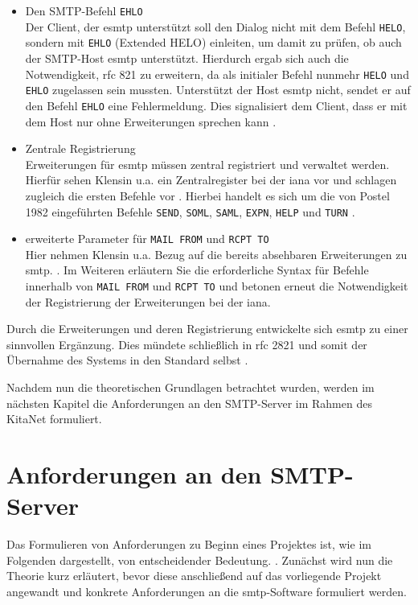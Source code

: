 \begin{itemize}
	\item{Den SMTP-Befehl \verb+EHLO+}\\
	Der Client, der \ac{esmtp} unterstützt soll den Dialog nicht mit dem Befehl \verb+HELO+, sondern mit \verb+EHLO+ (Extended HELO) einleiten, um damit zu prüfen, ob auch der SMTP-Host \ac{esmtp} unterstützt. Hierdurch ergab sich auch die Notwendigkeit, \ac{rfc} 821 zu erweitern, da als initialer Befehl nunmehr \verb+HELO+ und \verb+EHLO+ zugelassen sein mussten. Unterstützt der Host \ac{esmtp} nicht, sendet er auf den Befehl \verb+EHLO+ eine Fehlermeldung. Dies signalisiert dem Client, dass er mit dem Host nur ohne Erweiterungen sprechen kann \citep[vgl.][S. 3 ff.]{rfc1869}.
	\item{Zentrale Registrierung}\\
	Erweiterungen für \ac{esmtp} müssen zentral registriert und verwaltet werden. Hierfür sehen Klensin u.a. ein Zentralregister bei der \ac{iana} vor und schlagen zugleich die ersten Befehle vor \citep[vgl.][7]{rfc1869}. Hierbei handelt es sich um die von Postel 1982 eingeführten Befehle \verb+SEND+, \verb+SOML+, \verb+SAML+, \verb+EXPN+, \verb+HELP+ und \verb+TURN+ \citep[für die Befehle vgl.][S. 23 ff.]{rfc821}.
	\item{erweiterte Parameter für \verb+MAIL FROM+ und \verb+RCPT TO+}\\
	Hier nehmen Klensin u.a. Bezug auf die bereits absehbaren Erweiterungen zu \ac{smtp}.  \citep[][7]{rfc1869}. Im Weiteren erläutern Sie die erforderliche Syntax für Befehle innerhalb von \verb+MAIL FROM+ und \verb+RCPT TO+ und betonen erneut die Notwendigkeit der Registrierung der Erweiterungen bei der \ac{iana}.
\end{itemize}

Durch die Erweiterungen und deren Registrierung entwickelte sich \ac{esmtp} zu einer sinnvollen Ergänzung. Dies mündete schließlich in \ac{rfc} 2821 und somit der Übernahme des Systems in den Standard selbst \citep[vgl. u.a.][S. 7 ff]{rfc2821}.

Nachdem nun die theoretischen Grundlagen betrachtet wurden, werden im nächsten Kapitel die Anforderungen an den SMTP-Server im Rahmen des KitaNet formuliert. 





\chapter{Anforderungen an den SMTP-Server}
\label{sec:Anforderung}
Das Formulieren von Anforderungen zu Beginn eines Projektes ist, wie im Folgenden dargestellt, von entscheidender Bedeutung.  \citep[][77]{Hull2010}. Zunächst wird nun die Theorie kurz erläutert, bevor diese anschließend auf das vorliegende Projekt angewandt und konkrete Anforderungen an die \ac{smtp}-Software formuliert werden.

